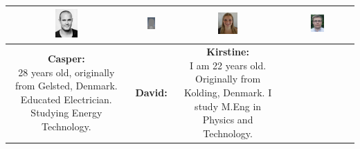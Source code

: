 \begin{table}[h]
\centering
\begin{tabular}{|c|c|c|c|}
\hline
\includegraphics[width=0.2\textwidth]{graphics/cgopic} & %
\includegraphics[width=0.2\textwidth]{graphics/AnonProfile} & %
\includegraphics[width=0.2\textwidth]{graphics/Kirstine} & %
\includegraphics[width=0.2\textwidth]{graphics/Nikolaj_profile} \\ \hline %
\parbox[t] {0.2\textwidth}{
\textbf{Casper:} \\
28 years old, originally from Gelsted, Denmark. Educated Electrician. Studying Energy Technology.
}

&

\parbox[t] {0.2\textwidth}{
\textbf{David:} \\

} 

&

\parbox[t] {0.2\textwidth}{
\textbf{Kirstine:} \\
I am 22 years old. Originally from Kolding, Denmark. I study M.Eng in Physics and Technology.
} 


\end{tabular}
\end{table}
